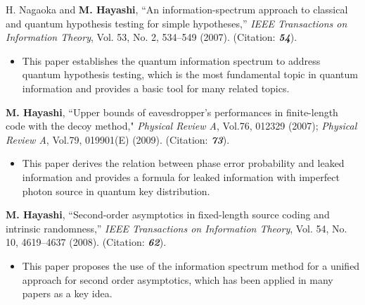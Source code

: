 \begin{thebibliography}{99}
\begin{itemize}
\end{itemize}
\vspace{3 mm}


 H. Nagaoka and \textbf{M. Hayashi}, 
``An information-spectrum approach to classical and quantum hypothesis testing for simple hypotheses,''
{\em IEEE Transactions on Information Theory}, 
Vol. 53, No. 2, 534--549 (2007).
(Citation: \textbf{\textit{54}}).


\begin{itemize}
\item 
This paper establishes the quantum information spectrum to address quantum hypothesis testing, which is the most fundamental topic in quantum information and 
provides a basic tool for many related topics.

\end{itemize}
\vspace{3 mm}


\textbf{M. Hayashi}, ``Upper bounds of eavesdropper's performances in finite-length code with the decoy method," 
{\em Physical Review A}, Vol.76, 012329 (2007); 
{\em Physical Review A}, Vol.79, 019901(E) (2009).
(Citation: \textbf{\textit{73}}).

\begin{itemize}
\item 
This paper derives the relation between phase error probability and 
leaked information and 
provides a formula for leaked information with imperfect photon source
in quantum key distribution.

\end{itemize}
\vspace{3 mm}


 \textbf{M. Hayashi}, 
``Second-order asymptotics in fixed-length source coding and intrinsic randomness,'' 
{\em IEEE Transactions on Information Theory}, 
Vol. 54, No. 10, 4619--4637 (2008). 
(Citation: \textbf{\textit{62}}).

\begin{itemize}
\item 
This paper proposes the use of the information spectrum method for 
a unified approach for second order asymptotics,
which has been applied in many papers as a key idea.

\end{itemize}
\vspace{3 mm}


\end{thebibliography}
